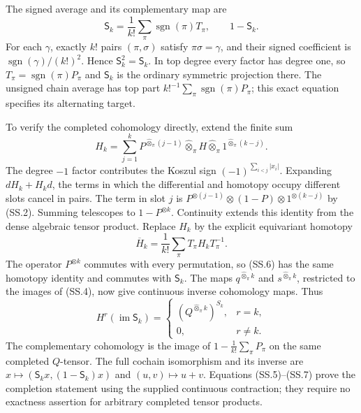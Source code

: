 The signed average and its complementary map are
\[
 \mathsf S_k=\frac1{k!}\sum_\pi\operatorname{sgn}(\pi)T_\pi,
 \qquad 1-\mathsf S_k.                                \tag{SS.4}
\]
For each \(\gamma\), exactly \(k!\) pairs \((\pi,\sigma)\)
satisfy \(\pi\sigma=\gamma\), and their signed coefficient
is \(\operatorname{sgn}(\gamma)/(k!)^2\).  Hence
\(\mathsf S_k^2=\mathsf S_k\).  In top degree every factor
has degree one, so \(T_\pi=\operatorname{sgn}(\pi)P_\pi\)
and \(\mathsf S_k\) is the ordinary symmetric projection there.
The unsigned chain average has top part
\(k!^{-1}\sum_\pi\operatorname{sgn}(\pi)P_\pi\);
this exact equation specifies its alternating target.

To verify the completed cohomology directly, extend the finite sum
\[
 H_k=\sum_{j=1}^k
 P^{\widehat\otimes_\pi(j-1)}\widehat\otimes_\pi H
 \widehat\otimes_\pi1^{\widehat\otimes_\pi(k-j)}.       \tag{SS.5}
\]
The degree \(-1\) factor contributes the Koszul sign
\((-1)^{\sum_{i<j}|x_i|}\).  Expanding \(dH_k+H_kd\),
the terms in which the differential and homotopy occupy different
slots cancel in pairs.  The term in slot \(j\) is
\(P^{\otimes(j-1)}\otimes(1-P)\otimes1^{\otimes(k-j)}\)
by (SS.2).  Summing telescopes to \(1-P^{\otimes k}\).
Continuity extends this identity from the dense algebraic tensor
product.  Replace \(H_k\) by the explicit equivariant homotopy
\[
 \overline H_k=\frac1{k!}\sum_\pi T_\pi H_kT_\pi^{-1}.
                                                               \tag{SS.6}
\]
The operator \(P^{\otimes k}\) commutes with every permutation,
so (SS.6) has the same homotopy identity and commutes with
\(\mathsf S_k\).  The maps \(q^{\widehat\otimes_\pi k}\)
and \(s^{\widehat\otimes_\pi k}\), restricted to the images
of (SS.4), now give continuous inverse cohomology maps.  Thus
\[
 H^r(\operatorname{im}\mathsf S_k)=
 \begin{cases}(Q^{\widehat\otimes_\pi k})^{S_k},&r=k,\\
 0,&r\ne k.\end{cases}                               \tag{SS.7}
\]
The complementary cohomology is the image of
\(1-\frac1{k!}\sum_\pi P_\pi\) on the same completed
\(Q\)-tensor.  The full cochain isomorphism and its inverse are
\(x\mapsto(\mathsf S_kx,(1-\mathsf S_k)x)\) and
\((u,v)\mapsto u+v\).  Equations (SS.5)--(SS.7) prove the
completion statement using the supplied continuous contraction;
they require no exactness assertion for arbitrary completed tensor
products.

